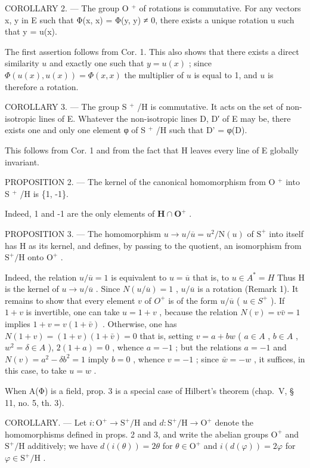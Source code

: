 COROLLARY 2. --- The group O \(^{+}\) of rotations is commutative. For any vectors x, y in E such that Φ(x, x) = Φ(y, y) ≠ 0, there exists a unique rotation u such that y = u(x).

The first assertion follows from Cor. 1. This also shows that there exists a direct similarity \(u\) and exactly one such that \(y = u(x)\) ; since \(\Phi(u(x), u(x)) = \Phi(x, x)\) the multiplier of \(u\) is equal to 1, and \(u\) is therefore a rotation.

COROLLARY 3. --- The group S \(^{+}\) /H is commutative. It acts on the set of non-isotropic lines of E. Whatever the non-isotropic lines D, D′ of E may be, there exists one and only one element φ of S \(^{+}\) /H such that D' = φ(D).

This follows from Cor. 1 and from the fact that H leaves every line of E globally invariant.

PROPOSITION 2. --- The kernel of the canonical homomorphism from O \(^{+}\) into S \(^{+}\) /H is \{1, -1\}.

Indeed, 1 and -1 are the only elements of \(\mathbf{H} \cap \mathbf{O}^{+}\) .

PROPOSITION 3. --- The homomorphism \(u \to u/\overline{u} = u^{2}/\mathrm{N}(u)\) of \(\mathrm{S}^{+}\) into itself has H as its kernel, and defines, by passing to the quotient, an isomorphism from \(\mathrm{S}^{+}/\mathrm{H}\) onto \(\mathrm{O}^{+}\) .

Indeed, the relation \(u/\overline{u} = 1\) is equivalent to \(u = \overline{u}\) that is, to \(u \in A^* = H\) Thus H is the kernel of \(u \to u/\overline{u}\) . Since \(N(u/\overline{u}) = 1\) , \(u/\overline{u}\) is a rotation (Remark 1). It remains to show that every element \(v\) of \(O^+\) is of the form \(u/\overline{u}\) ( \(u \in S^+\) ). If \(1 + v\) is invertible, one can take \(u = 1 + v\) , because the relation \(N(v) = v\bar{v} = 1\) implies \(1 + v = v(1 + \bar{v})\) . Otherwise, one has \(N(1 + v) = (1 + v)(1 + \bar{v}) = 0\) that is, setting \(v = a + bw\) ( \(a \in A\) , \(b \in A\) , \(w^2 = \delta \in A\) ), \(2(1 + a) = 0\) , whence \(a = -1\) ; but the relations \(a = -1\) and \(N(v) = a^2 - \delta b^2 = 1\) imply \(b = 0\) , whence \(v = -1\) ; since \(\bar{w} = -w\) , it suffices, in this case, to take \(u = w\) .

When A(Φ) is a field, prop. 3 is a special case of Hilbert's theorem (chap.~V, § 11, no. 5, th. 3).

COROLLARY. — Let \(i: \mathrm{O}^{+} \to \mathrm{S}^{+}/\mathrm{H}\) and \(d: \mathrm{S}^{+}/\mathrm{H} \to \mathrm{O}^{+}\) denote the homomorphisms defined in props. 2 and 3, and write the abelian groups \(\mathrm{O}^{+}\) and \(\mathrm{S}^{+}/\mathrm{H}\) additively; we have \(d(i(\theta)) = 2\theta\) for \(\theta \in \mathrm{O}^{+}\) and \(i(d(\varphi)) = 2\varphi\) for \(\varphi \in \mathrm{S}^{+}/\mathrm{H}\) .

